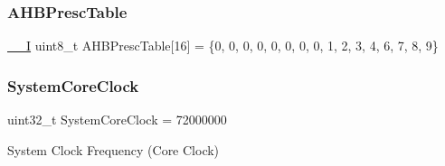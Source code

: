 \subsubsection{\texorpdfstring{AHBPrescTable}{AHBPrescTable}}
{\footnotesize\ttfamily \mbox{\hyperlink{core__sc300_8h_af63697ed9952cc71e1225efe205f6cd3}{\+\_\+\+\_\+I}} uint8\+\_\+t A\+H\+B\+Presc\+Table\mbox{[}16\mbox{]} = \{0, 0, 0, 0, 0, 0, 0, 0, 1, 2, 3, 4, 6, 7, 8, 9\}}

\mbox{\label{group___s_t_m32_f10x___system___private___defines_gaa3cd3e43291e81e795d642b79b6088e6}} 
\subsubsection{\texorpdfstring{SystemCoreClock}{SystemCoreClock}}
{\footnotesize\ttfamily uint32\+\_\+t System\+Core\+Clock = 72000000}

System Clock Frequency (Core Clock) 
